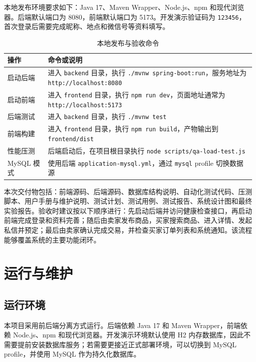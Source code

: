 ﻿\documentclass[UTF8,a4paper,12pt]{ctexart}
\begin{document}
本地发布环境要求如下：Java 17、Maven Wrapper、Node.js、npm 和现代浏览器。后端默认端口为 8080，前端默认端口为 5173。开发演示验证码为 \texttt{123456}，首次登录后需要完成昵称、地点和微信号等资料填写。

\begin{table}[H]
  \centering
  \caption{本地发布与验收命令}
  \begin{tabular}{p{4.4cm}p{8.6cm}}
    \toprule
    操作 & 命令或说明 \\
    \midrule
    启动后端 & 进入 \texttt{backend} 目录，执行 \texttt{./mvnw spring-boot:run}，服务地址为 \texttt{http://localhost:8080} \\
    启动前端 & 进入 \texttt{frontend} 目录，执行 \texttt{npm run dev}，页面地址通常为 \texttt{http://localhost:5173} \\
    后端测试 & 进入 \texttt{backend} 目录，执行 \texttt{./mvnw test} \\
    前端构建 & 进入 \texttt{frontend} 目录，执行 \texttt{npm run build}，产物输出到 \texttt{frontend/dist} \\
    性能压测 & 后端启动后，在项目根目录执行 \texttt{node scripts/qa-load-test.js} \\
    MySQL 模式 & 使用后端 \texttt{application-mysql.yml}，通过 \texttt{mysql} profile 切换数据源 \\
    \bottomrule
  \end{tabular}
\end{table}

本次交付物包括：前端源码、后端源码、数据库结构说明、自动化测试代码、压测脚本、用户手册与维护说明、测试计划、测试用例、测试报告、系统设计图和最终实验报告。验收时建议按以下顺序进行：先启动后端并访问健康检查接口，再启动前端完成登录和资料完善；随后由卖家发布商品，买家搜索商品、进入详情、发起私信并预定；最后由卖家确认完成交易，并检查买家订单列表和系统通知。该流程能够覆盖系统的主要功能闭环。

\section{运行与维护}

\subsection{运行环境}
本项目采用前后端分离方式运行。后端依赖 Java 17 和 Maven Wrapper，前端依赖 Node.js、npm 和现代浏览器。开发演示环境默认使用 H2 内存数据库，因此不需要提前安装数据库服务；若需要更接近正式部署环境，可以切换到 MySQL profile，并使用 MySQL 作为持久化数据库。
\end{document}
